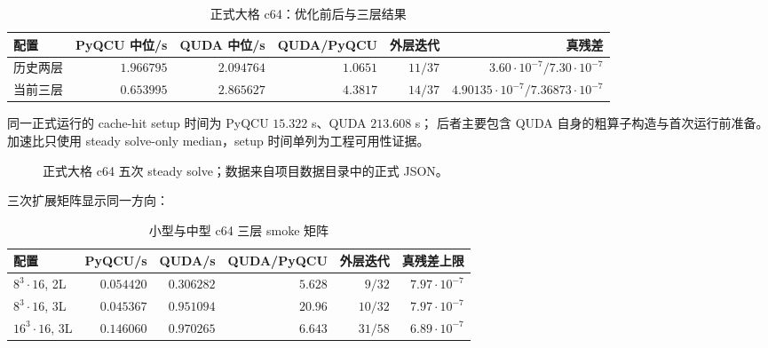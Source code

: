 \documentclass[UTF8,a4paper,11pt]{ctexart}
\begin{document}
\begin{table}[htbp]
\centering
\caption{正式大格 c64：优化前后与三层结果}
\small
\begin{tabular}{@{}lrrrrr@{}}
\toprule
配置 & PyQCU 中位/s & QUDA 中位/s & QUDA/PyQCU & 外层迭代 & 真残差 \\
\midrule
历史两层 & $1.966795$ & $2.094764$ & $1.0651$ & $11/37$ &
$3.60\cdot10^{-7}/7.30\cdot10^{-7}$ \\
当前三层 & $0.653995$ & $2.865627$ & $\mathbf{4.3817}$ & $14/37$ &
$4.90135\cdot10^{-7}/7.36873\cdot10^{-7}$ \\
\bottomrule
\end{tabular}
\end{table}

同一正式运行的 cache-hit setup 时间为 PyQCU $15.322$ s、QUDA $213.608$ s；
后者主要包含 QUDA 自身的粗算子构造与首次运行前准备。加速比只使用
steady solve-only median，setup 时间单列为工程可用性证据。

\begin{figure}[htbp]
\centering
{}
\caption{正式大格 c64 五次 steady solve；数据来自项目数据目录中的正式 JSON。}
\end{figure}

三次扩展矩阵显示同一方向：

\begin{table}[htbp]
\centering
\caption{小型与中型 c64 三层 smoke 矩阵}
\small
\begin{tabular}{@{}lrrrrr@{}}
\toprule
配置 & PyQCU/s & QUDA/s & QUDA/PyQCU & 外层迭代 & 真残差上限 \\
\midrule
$8^3\cdot16$, 2L & $0.054420$ & $0.306282$ & $5.628$ & $9/32$ &
$7.97\cdot10^{-7}$ \\
$8^3\cdot16$, 3L & $0.045367$ & $0.951094$ & $20.96$ & $10/32$ &
$7.97\cdot10^{-7}$ \\
$16^3\cdot16$, 3L & $0.146060$ & $0.970265$ & $6.643$ & $31/58$ &
$6.89\cdot10^{-7}$ \\
\bottomrule
\end{tabular}
\end{table}
\end{document}
